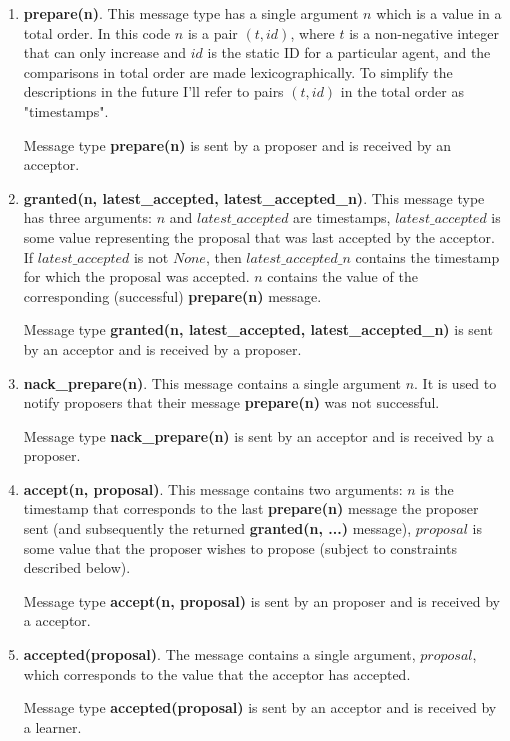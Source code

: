 \documentclass[10pt,letter]{article}
\begin{document}
\begin{enumerate}
\item{\textbf{prepare(n)}.} This message type has a single argument $n$ which is a value in a total order. In this code $n$ is a pair $(t, id)$, where $t$ is a non-negative integer that can only increase and $id$ is the static ID for a particular agent, and the comparisons in total order are made lexicographically. To simplify the descriptions in the future I'll refer to pairs $(t, id)$ in the total order as "timestamps".

Message type \textbf{prepare(n)} is sent by a proposer and is received by an acceptor.


\item{\textbf{granted(n, latest\_accepted, latest\_accepted\_n)}.} This message type has three arguments: $n$ and $latest\_accepted$ are timestamps, $latest\_accepted$ is some value representing the proposal that was last accepted by the acceptor. If $latest\_accepted$ is not $None$, then $latest\_accepted\_n$ contains the timestamp for which the proposal was accepted. $n$ contains the value of the corresponding (successful) \textbf{prepare(n)} message.

Message type \textbf{granted(n, latest\_accepted, latest\_accepted\_n)} is sent by an acceptor and is received by a proposer.


\item{\textbf{nack\_prepare(n)}.} This message contains a single argument $n$. It is used to notify proposers that their message \textbf{prepare(n)} was not successful.

Message type \textbf{nack\_prepare(n)} is sent by an acceptor and is received by a proposer.


\item{\textbf{accept(n, proposal)}.} This message contains two arguments: $n$ is the timestamp that corresponds to the last \textbf{prepare(n)} message the proposer sent (and subsequently the returned \textbf{granted(n, ...)} message), $proposal$ is some value that the proposer wishes to propose (subject to constraints described below).

Message type \textbf{accept(n, proposal)} is sent by an proposer and is received by a acceptor.


\item{\textbf{accepted(proposal)}.} The message contains a single argument, $proposal$, which corresponds to the value that the acceptor has accepted.

Message type \textbf{accepted(proposal)} is sent by an acceptor and is received by a learner.
\end{enumerate}
\end{document}
